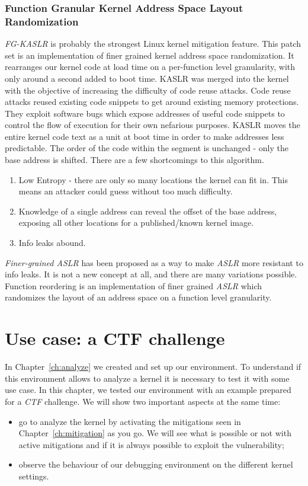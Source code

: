 \documentclass{masterthesis}
\newcommand{\refToChapter}[1]{Chapter~\ref{ch:#1}\xspace}
\begin{document}
\subsection{Function Granular Kernel Address Space Layout Randomization}
\label{subsect:FG-KASLR}
\emph{FG-KASLR} is probably the strongest Linux kernel mitigation feature.
This patch set is an implementation of finer grained kernel address space randomization. It rearranges our kernel code at load time on a per-function level granularity, with only around a second added to boot time.
KASLR was merged into the kernel with the objective of increasing the difficulty of code reuse attacks. Code reuse attacks reused existing code snippets to get around existing memory protections. They exploit software bugs which expose addresses of useful code snippets to control the flow of execution for their own nefarious purposes. KASLR moves the entire kernel
code text as a unit at boot time in order to make addresses less predictable.
The order of the code within the segment is unchanged - only the base address is shifted. There are a few shortcomings to this algorithm.
\begin{enumerate}
\item Low Entropy - there are only so many locations the kernel can fit in. This means an attacker could guess without too much difficulty.
\item Knowledge of a single address can reveal the offset of the base address, exposing all other locations for a published/known kernel image.
\item Info leaks abound.
\end{enumerate}

\emph{Finer-grained ASLR} has been proposed as a way to make \emph{ASLR} more resistant to info leaks. It is not a new concept at all, and there are many variations possible. Function reordering is an implementation of finer grained \emph{ASLR} which randomizes the layout of an address space on a function level granularity.

\chapter{Use case: a CTF challenge}
\label{ch:adding mitigation}
In \refToChapter{analyze} we created and set up our environment. To understand if this environment allows to analyze a kernel it is necessary to test it with some use case.
In this chapter, we tested our environment with an example prepared for a \emph{CTF} challenge. We will show two important aspects at the same time: 
\begin{itemize}
\item go to analyze the kernel by activating the mitigations seen in \refToChapter{mitigation} as you go. We will see what is possible or not with active mitigations and if it is always possible to exploit the vulnerability;
\item observe the behaviour of our debugging environment on the different kernel settings.
\end{itemize}
\end{document}
